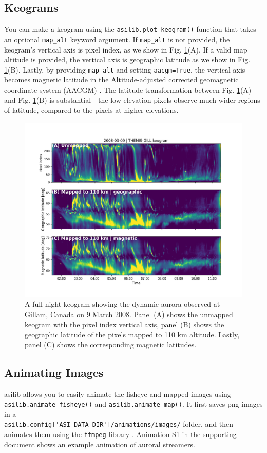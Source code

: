 \documentclass[utf8]{FrontiersinHarvard} %
\begin{document}
\subsection{Keograms}
You can make a keogram using the \verb|asilib.plot_keogram()| function that takes an optional \verb|map_alt| keyword argument. If \verb|map_alt| is not provided, the keogram's vertical axis is pixel index, as we show in Fig. \ref{fig3}(A). If a valid map altitude is provided, the vertical axis is geographic latitude as we show in Fig. \ref{fig3}(B). Lastly, by providing \verb|map_alt| and setting \verb|aacgm=True|, the vertical axis becomes magnetic latitude in the Altitude-adjusted corrected geomagnetic coordinate system (AACGM) \citep{Shepherd2014}. The latitude transformation between Fig. \ref{fig3}(A) and Fig. \ref{fig3}(B) is substantial---the low elevation pixels observe much wider regions of latitude, compared to the pixels at higher elevations.

\begin{figure}
      \includegraphics[width=\textwidth]{figures/fig3.jpg}
      \caption{A full-night keogram showing the dynamic aurora observed at Gillam, Canada on 9 March 2008. Panel (A) shows the unmapped keogram with the pixel index vertical axis, panel (B) shows the geographic latitude of the pixels mapped to 110 km altitude. Lastly, panel (C) shows the corresponding magnetic latitudes.}
      \label{fig3}
\end{figure}


\subsection{Animating Images}
asilib allows you to easily animate the fisheye and mapped images using \verb|asilib.animate_fisheye()| and \verb|asilib.animate_map()|. It first saves png images in a \\ \verb|asilib.config['ASI_DATA_DIR']/animations/images/| folder, and then animates them using the \verb|ffmpeg| library \citep{ffmpeg} . Animation S1 in the supporting document shows an example animation of auroral streamers.
\end{document}
